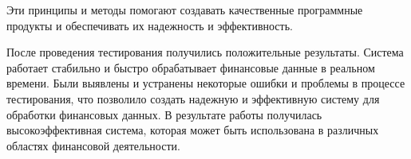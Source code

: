 Эти принципы и методы помогают создавать качественные программные продукты и
обеспечивать их надежность и эффективность.

После проведения тестирования получились положительные результаты. Система работает стабильно и быстро обрабатывает финансовые данные в реальном времени. Были выявлены и устранены некоторые ошибки и проблемы в процессе тестирования, что позволило создать надежную и эффективную систему для обработки финансовых данных. В результате работы получилась высокоэффективная система, которая может быть использована в различных областях финансовой деятельности.